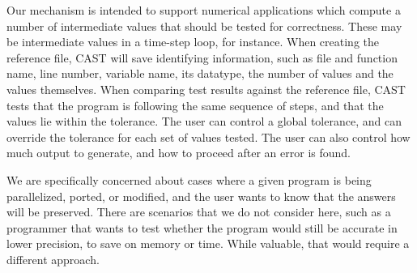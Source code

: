 Our mechanism is intended to support numerical applications which compute a number of intermediate values that should be tested for correctness.
These may be intermediate values in a time-step loop, for instance.
When creating the reference file, CAST will save identifying information, such as file and function name, line number, variable name, its datatype, the number of values and the values themselves.
When comparing test results against the reference file, CAST tests that the program is following the same sequence of steps, and that the values lie within the tolerance.
The user can control a global tolerance, and can override the tolerance for each set of values tested.
The user can also control how much output to generate, and how to proceed after an error is found.

We are specifically concerned about cases where a given program is being parallelized, ported, or modified, and the user wants to know that the answers will be preserved.
There are scenarios that we do not consider here,
such as a programmer that wants to test whether the program would still be accurate in lower precision, to save on memory or time.
While valuable, that would require a different approach.

